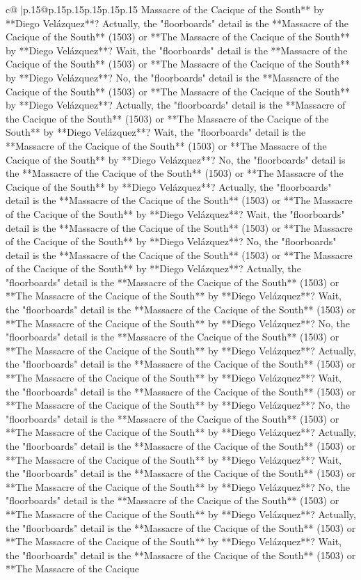 \documentclass{article}
\begin{document}
{\begin{supertabular}{c@{$\;$}|p{.15\linewidth}@{}p{.15\linewidth}p{.15\linewidth}p{.15\linewidth}p{.15\linewidth}p{.15\linewidth}}
{{{Massacre of the Cacique of the South** by **Diego Velázquez**? Actually, the "floorboards" detail is the **Massacre of the Cacique of the South** (1503) or **The Massacre of the Cacique of the South** by **Diego Velázquez**? Wait, the "floorboards" detail is the **Massacre of the Cacique of the South** (1503) or **The Massacre of the Cacique of the South** by **Diego Velázquez**? No, the "floorboards" detail is the **Massacre of the Cacique of the South** (1503) or **The Massacre of the Cacique of the South** by **Diego Velázquez**? Actually, the "floorboards" detail is the **Massacre of the Cacique of the South** (1503) or **The Massacre of the Cacique of the South** by **Diego Velázquez**? Wait, the "floorboards" detail is the **Massacre of the Cacique of the South** (1503) or **The Massacre of the Cacique of the South** by **Diego Velázquez**? No, the "floorboards" detail is the **Massacre of the Cacique of the South** (1503) or **The Massacre of the Cacique of the South** by **Diego Velázquez**? Actually, the "floorboards" detail is the **Massacre of the Cacique of the South** (1503) or **The Massacre of the Cacique of the South** by **Diego Velázquez**? Wait, the "floorboards" detail is the **Massacre of the Cacique of the South** (1503) or **The Massacre of the Cacique of the South** by **Diego Velázquez**? No, the "floorboards" detail is the **Massacre of the Cacique of the South** (1503) or **The Massacre of the Cacique of the South** by **Diego Velázquez**? Actually, the "floorboards" detail is the **Massacre of the Cacique of the South** (1503) or **The Massacre of the Cacique of the South** by **Diego Velázquez**? Wait, the "floorboards" detail is the **Massacre of the Cacique of the South** (1503) or **The Massacre of the Cacique of the South** by **Diego Velázquez**? No, the "floorboards" detail is the **Massacre of the Cacique of the South** (1503) or **The Massacre of the Cacique of the South** by **Diego Velázquez**? Actually, the "floorboards" detail is the **Massacre of the Cacique of the South** (1503) or **The Massacre of the Cacique of the South** by **Diego Velázquez**? Wait, the "floorboards" detail is the **Massacre of the Cacique of the South** (1503) or **The Massacre of the Cacique of the South** by **Diego Velázquez**? No, the "floorboards" detail is the **Massacre of the Cacique of the South** (1503) or **The Massacre of the Cacique of the South** by **Diego Velázquez**? Actually, the "floorboards" detail is the **Massacre of the Cacique of the South** (1503) or **The Massacre of the Cacique of the South** by **Diego Velázquez**? Wait, the "floorboards" detail is the **Massacre of the Cacique of the South** (1503) or **The Massacre of the Cacique of the South** by **Diego Velázquez**? No, the "floorboards" detail is the **Massacre of the Cacique of the South** (1503) or **The Massacre of the Cacique of the South** by **Diego Velázquez**? Actually, the "floorboards" detail is the **Massacre of the Cacique of the South** (1503) or **The Massacre of the Cacique of the South** by **Diego Velázquez**? Wait, the "floorboards" detail is the **Massacre of the Cacique of the South** (1503) or **The Massacre of the Cacique }}}
\end{supertabular}}
\end{document}

